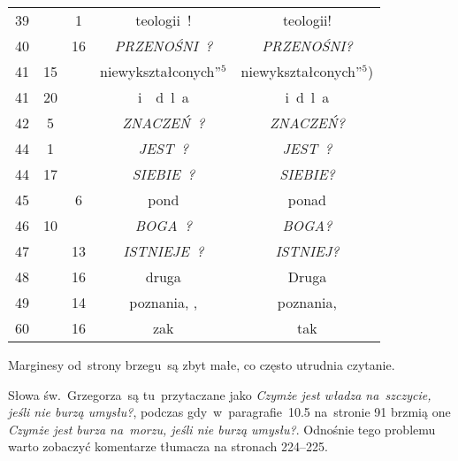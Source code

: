 \documentclass[a4paper,11pt]{article}
\begin{document}
\begin{center}
\begin{tabular}{|c|c|c|c|c|}
    39  & &  1 & teologii~! & teologii! \\
    40  & & 16 & \emph{PRZENOŚNI~?} & \emph{PRZENOŚNI?} \\
    41  & 15 & & niewykształconych”$^{ 5 }$
           & niewykształconych”$^{ 5 }$) \\
    41  & 20 & & i~~d~l~a & i{}\, d~l~a \\
    42  &  5 & & \emph{ZNACZEŃ~?} & \emph{ZNACZEŃ?} \\
    44  &  1 & & \emph{JEST~?} & \emph{JEST~?} \\
    44  & 17 & & \emph{SIEBIE~?} & \emph{SIEBIE?} \\
    45  & &  6 & pond & ponad \\
    46  & 10 & & \emph{BOGA~?} & \emph{BOGA?} \\
    47  & & 13 & \emph{ISTNIEJE~?} & \emph{ISTNIEJ?} \\
    48  & & 16 & druga & Druga \\
    49  & & 14 & poznania,{ }, & poznania, \\
    60  & & 16 & zak & tak \\
    \hline
  \end{tabular}

\end{center}

\vspace{\spaceTwo}










\newpage
{}



\start Marginesy od~strony brzegu~są zbyt małe, co często utrudnia
czytanie.

\vspace{\spaceFour}


\start {} Słowa św.~Grzegorza~są tu~przytaczane jako
\emph{Czymże jest władza na~szczycie, jeśli nie burzą umysłu?},
podczas gdy~w~paragrafie~10.5 na~stronie 91 brzmią one \emph{Czymże
  jest burza na~morzu, jeśli nie burzą umysłu?}. Odnośnie tego
problemu warto zobaczyć komentarze tłumacza na stronach 224--225.
\end{document}

